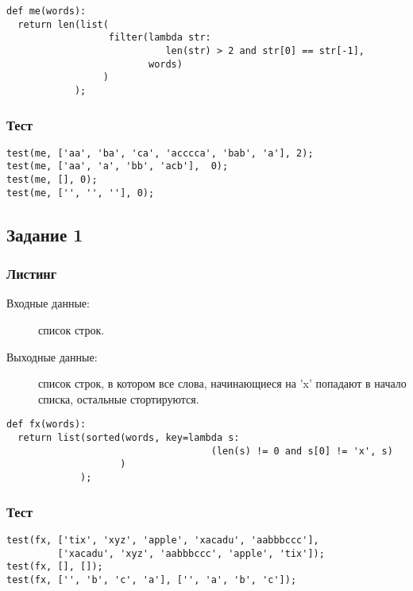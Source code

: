 \documentclass[12pt, a4paper] {ncc}
\begin{document}
        \lstset{language=Python}
        \begin{lstlisting}
def me(words):
  return len(list(
                  filter(lambda str:
                            len(str) > 2 and str[0] == str[-1],
                         words)
                 )
            );
        \end{lstlisting}

        \subsubsection{Тест}

        \begin{lstlisting}
test(me, ['aa', 'ba', 'ca', 'acccca', 'bab', 'a'], 2);
test(me, ['aa', 'a', 'bb', 'acb'],  0);
test(me, [], 0);
test(me, ['', '', ''], 0);
        \end{lstlisting}

    \subsection{Задание 1}

        \subsubsection{Листинг}
        \begin{description}
            \item[Входные данные:] список строк.
            \item[Выходные данные:] список строк, в котором все слова, начинающиеся на 'x'
                 попадают в начало списка, остальные стортируются. 
        \end{description}

        \begin{lstlisting}
def fx(words):
  return list(sorted(words, key=lambda s:
                                    (len(s) != 0 and s[0] != 'x', s)
                    )
             );
        \end{lstlisting}

        \subsubsection{Тест}

        \begin{lstlisting}
test(fx, ['tix', 'xyz', 'apple', 'xacadu', 'aabbbccc'],
         ['xacadu', 'xyz', 'aabbbccc', 'apple', 'tix']);
test(fx, [], []);
test(fx, ['', 'b', 'c', 'a'], ['', 'a', 'b', 'c']);
        \end{lstlisting}
\end{document}

